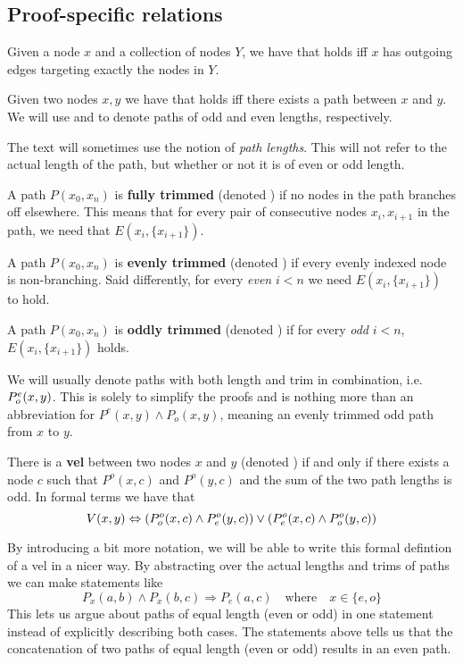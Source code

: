 \subsection{Proof-specific relations}
\label{sub:Proof-specific relations}
\begin{definition}
  Given a node $x$ and a collection of nodes $Y$, we have that  holds iff $x$ has outgoing edges targeting exactly the nodes in $Y$.
\end{definition}
\begin{definition}
  Given two nodes $x,y$ we have that  holds iff there exists a path between $x$ and $y$.
  We will use  and  to denote paths of odd and even lengths, respectively.
\end{definition}
The text will sometimes use the notion of \textit{path lengths}.  This will not refer to the actual length of the path, but whether or not it is of even or odd length.
\begin{definition}
  A path $P(x_0,x_n)$ is \textbf{fully trimmed} (denoted ) if no nodes in the path branches off elsewhere.
  This means that for every pair of consecutive nodes $x_i,x_{i+1}$ in the path, we need that $E(x_i,\{ x_{i+1} \})$.
\end{definition}
\begin{definition}
  A path $P(x_0,x_n)$ is \textbf{evenly trimmed} (denoted ) if every evenly indexed node is non-branching.
  Said differently, for every \textit{even} $i < n$ we need $E(x_i,\{x_{i+1}\})$ to hold.
\end{definition}
\begin{definition}
  A path $P(x_0,x_n)$ is \textbf{oddly trimmed} (denoted ) if for every \textit{odd} $i < n$, $E(x_i,\{x_{i+1}\})$ holds.
\end{definition}
We will usually denote paths with both length and trim in combination, i.e. $P^e_o(x,y)$.
This is solely to simplify the proofs and is nothing more than an abbreviation for $P^e(x,y) \wedge P_o(x,y)$, meaning an evenly trimmed odd path from $x$ to $y$.
\begin{definition}
  There is a \textbf{vel} between two nodes $x$ and $y$ (denoted ) if and only if there exists a node $c$ such that $P^o(x,c)$ and $P^o(y,c)$ and the sum of the two path lengths is odd. In formal terms we have that
  \[
  V(x,y) \Leftrightarrow (P^o_o(x,c) \wedge P^o_e(y,c)) \vee (P^o_e(x,c) \wedge P^o_o(y,c))
  \]
\end{definition}
By introducing a bit more notation, we will be able to write this formal defintion of a vel in a nicer way.
By abstracting over the actual lengths and trims of paths we can make statements like \[P_x(a,b) \wedge P_x(b,c) \Rightarrow P_e(a,c) \quad\text{where}\quad x \in \{e,o\}\]
This lets us argue about paths of equal length (even or odd) in one statement instead of explicitly describing both cases.
The statements above tells us that the concatenation of two paths of equal length (even or odd) results in an even path.

